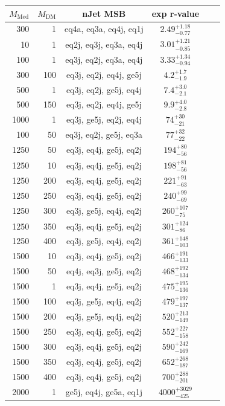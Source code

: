 \begin{table}
  \centering
  \begin{tabular}{rrcccc}
    \hline\hline
    $M_{\text{Med}}$ & $M_{\text{DM}}$ & nJet MSB & exp r-value\\
    \hline
  300 &   1 & eq4a, eq3a, eq4j, eq1j & $2.49_{-0.77}^{+1.18}$ \\
   10 &   1 & eq2j, eq3j, eq3a, eq4j & $3.01_{-0.85}^{+1.21}$ \\
  100 &   1 & eq3j, eq2j, eq3a, eq4j & $3.33_{-0.94}^{+1.34}$ \\
  300 & 100 & eq3j, eq2j, eq4j, ge5j & $4.2_{-1.9}^{+1.7}$ \\
  500 &   1 & eq3j, eq2j, ge5j, eq4j & $7.4_{-2.1}^{+3.0}$ \\
  500 & 150 & eq3j, eq2j, eq4j, ge5j & $9.9_{-2.8}^{+4.0}$ \\
 1000 &   1 & eq3j, ge5j, eq2j, eq4j & $74_{-21}^{+30}$ \\
  100 &  50 & eq3j, eq2j, ge5j, eq3a & $77_{-22}^{+32}$ \\
 1250 &  50 & eq3j, eq4j, ge5j, eq2j & $194_{-56}^{+80}$ \\
 1250 &  10 & eq3j, eq4j, ge5j, eq2j & $198_{-56}^{+81}$ \\
 1250 & 200 & eq3j, eq4j, ge5j, eq2j & $221_{-63}^{+91}$ \\
 1250 & 250 & eq3j, eq4j, ge5j, eq2j & $240_{-69}^{+99}$ \\
 1250 & 300 & eq3j, ge5j, eq4j, eq2j & $260_{-75}^{+107}$ \\
 1250 & 350 & eq3j, eq4j, ge5j, eq2j & $301_{-86}^{+124}$ \\
 1250 & 400 & eq3j, ge5j, eq4j, eq2j & $361_{-103}^{+148}$ \\
 1500 &  10 & eq3j, eq4j, ge5j, eq2j & $466_{-133}^{+191}$ \\
 1500 &  50 & eq4j, eq3j, ge5j, eq2j & $468_{-134}^{+192}$ \\
 1500 &   1 & eq3j, eq4j, ge5j, eq2j & $475_{-136}^{+195}$ \\
 1500 & 100 & eq3j, ge5j, eq4j, eq2j & $479_{-137}^{+197}$ \\
 1500 & 200 & eq3j, ge5j, eq4j, eq2j & $520_{-149}^{+213}$ \\
 1500 & 250 & eq3j, eq4j, ge5j, eq2j & $552_{-158}^{+227}$ \\
 1500 & 300 & eq3j, eq4j, ge5j, eq2j & $590_{-169}^{+242}$ \\
 1500 & 350 & eq3j, eq4j, ge5j, eq2j & $652_{-187}^{+268}$ \\
 1500 & 400 & eq3j, eq4j, ge5j, eq2j & $700_{-201}^{+288}$ \\
 2000 &   1 & ge5j, eq4j, ge5a, eq1j & $4000_{-425}^{+3029}$ \\


\end{tabular}
\end{table}
